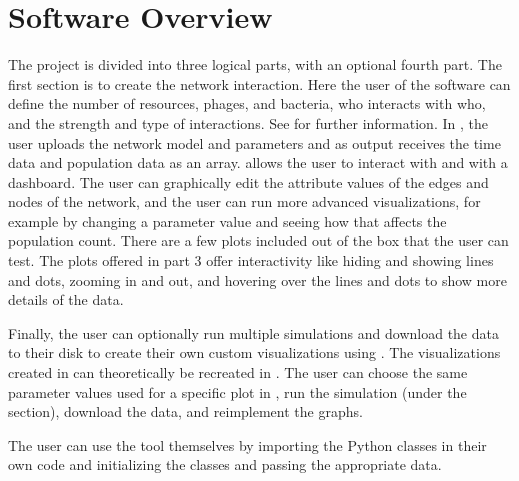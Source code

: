 \section{Software Overview}
The project is divided into three logical parts, with an optional fourth part.
The first section is to create the network interaction. 
Here the user of the software can define the number of resources, phages, and bacteria, who interacts with who, and the strength and type of interactions. See  for further information. 
In , the user uploads the network model and parameters and as output receives the time data and population data as an array. 
 allows the user to interact with  and  with a dashboard. 
The user can graphically edit the attribute values of the edges and nodes of the network, and the user can run more advanced visualizations, for example by changing a parameter value and seeing how that affects the population count. 
There are a few plots included out of the box that the user can test. 
The plots offered in part 3 offer interactivity like hiding and showing lines and dots, zooming in and out, and hovering over the lines and dots to show more details of the data. 

Finally, the user can optionally run multiple simulations and download the data to their disk to create their own custom visualizations using . 
The visualizations created in  can theoretically be recreated in . 
The user can choose the same parameter values used for a specific plot in , run the simulation (under the  section), download the data, and reimplement the graphs. 

The user can use the tool themselves by importing the Python classes in their own code and initializing the classes and passing the appropriate data. 